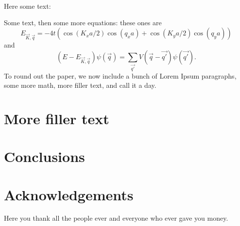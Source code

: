 \documentclass[twoside,british,a4paper,twocolumn]{article}
\begin{document}
Here some text: \lipsum[7] 

Some text, then some more equations: these ones are
$$
E_{\vec{K},\vec{q}}=-4t\left(\cos(K_xa/2)\cos(q_xa)+\cos(K_ya/2)\cos(q_ya)\right)
$$ 
and 
\begin{equation}
(E-E_{\vec{K},\vec{q}})\psi(\vec{q})=\sum_{\vec{q'}}V(\vec{q}-\vec{q'})\psi(\vec{q'}). 
\end{equation}
To round out the paper, we now include a bunch of Lorem Ipsum paragraphs, some more math, more filler text, and call it a day.

\lipsum[1-2]


\section{More filler text}

\lipsum[1-6]

\section{Conclusions}

\lipsum[11-12]


\section*{Acknowledgements}
Here you thank all the people ever and everyone who ever gave you money.

\balance





 
{}



\hfill %
\end{document}
